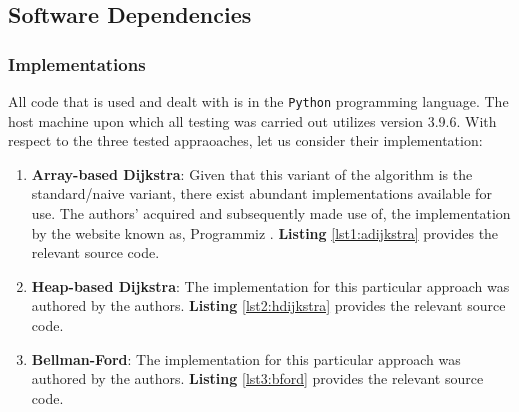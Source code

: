 \documentclass[a4paper, 12pt]{report}
\theoremstyle{definition}
\begin{document}
\subsection{Software Dependencies}
\label{sec:5.1.4}

\subsubsection{Implementations}
All code that is used and dealt with is in the \texttt{Python} programming language. The host machine upon which all testing was carried out utilizes version 3.9.6. With respect to the three tested appraoaches, let us consider their implementation:
\begin{enumerate}
  \item \textbf{Array-based Dijkstra}: Given that this variant of the algorithm is the standard/naive variant, there exist abundant implementations available for use. The authors' acquired and subsequently made use of, the implementation by the website 
  known as, Programmiz \cite{dijkstraProgrammiz}. \textbf{Listing} \ref{lst1:adijkstra} provides the relevant source code.
    
  \label{lst1:adijkstra}
  \item \textbf{Heap-based Dijkstra}: The implementation for this particular approach was authored by the authors. \textbf{Listing} \ref{lst2:hdijkstra} provides the relevant source code.
    
  \label{lst2:hdijkstra}
  \item \textbf{Bellman-Ford}: The implementation for this particular approach was authored by the authors. \textbf{Listing} \ref{lst3:bford} provides the relevant source code.
    
  \label{lst3:bford}
\end{enumerate}
\end{document}
